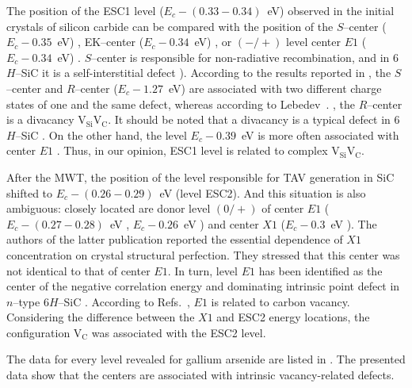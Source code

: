 \documentclass[10pt]{iopart}
\begin{document}
The position of the ESC1 level ($E_c-(0.33-0.34)$~eV) observed in the initial crystals of silicon carbide can be compared
with the position of the $S$--center ($E_c-0.35$~eV) \cite{Lebed1999En,Anikin1991:2En,Anikin1991:3En},
EK–center ($E_c-0.34$~eV) \cite{Kuznets1997En},
or $(-/+)$ level center $E1$ ($E_c-0.34$~eV) \cite{Lebed1999En}.
$S$--center is responsible for non-radiative recombination, and
in 6$H$–SiC it is a self-interstitial defect \cite{Lebed1999En}).
According to the results reported in \cite{Anikin1991:2En,Anikin1991:3En},
the $S$--center and $R$--center ($E_c-1.27$~eV) are associated with two different charge states
of one and the same defect,
whereas according to Lebedev~\etal. \cite{Lebedev2000En},
the $R$--center is a divacancy $\mathrm{V}_\mathrm{Si}\mathrm{V}_\mathrm{C}$.
It should be noted that  a divacancy is a typical defect in 6$H$--SiC \cite{SiCBaran,SiCDavid}.
On the other hand, the level $E_c-0.39$~eV is more often associated with center $E1$ \cite{SiCWei,SiCKoizumi}.
Thus, in our opinion, ESC1 level is related to complex $\mathrm{V}_\mathrm{Si}\mathrm{V}_\mathrm{C}$.

After the MWT, the position of the level responsible for TAV generation in SiC shifted to $E_c-(0.26-0.29)$~eV (level ESC2).
And this situation is also ambiguous: closely located are donor level $(0/+)$ of
center $E1$ ($E_c-(0.27-0.28)$~eV \cite{Hemmingsson},
$E_c-0.26$~eV \cite{SiCWei,SiCKoizumi})
and center $X1$ ($E_c-0.3$~eV \cite{Lebedev2001En}).
The authors of the latter publication reported the essential dependence of $X1$ concentration on crystal structural perfection.
They stressed that this center was not identical to that of center $E1$.
In turn, level $E1$ has been identified as the center of the negative
correlation energy \cite{Lebedev2001En,SiCWei}
and dominating intrinsic point defect in $n$--type 6$H$--SiC \cite{SiCSasaki}.
According to Refs.~\cite{SiCSasaki,SiCWei}, $E1$ is related to carbon vacancy.
Considering the difference between the $X1$ and ESC2 energy locations,
the configuration $\mathrm{V}_\mathrm{C}$ was associated with the ESC2 level.


The data for every level revealed for gallium arsenide are listed in .
The presented data show that the centers are associated with intrinsic vacancy-related defects.
\end{document}
